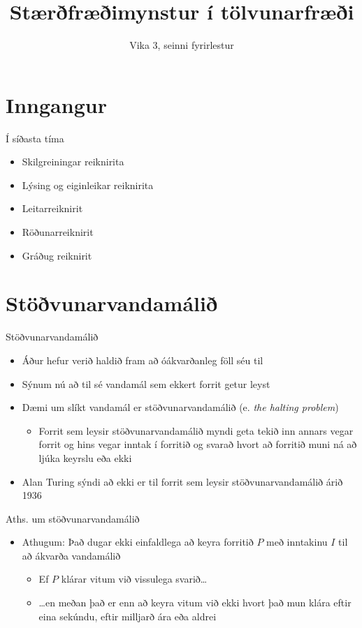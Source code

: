 \documentclass[handout]{beamer}
\title{Stærðfræðimynstur í tölvunarfræði}
\subtitle{Vika 3, seinni fyrirlestur}
\begin{document}
\begin{frame}
\titlepage
\end{frame}

\section{Inngangur}

\begin{frame}{Í síðasta tíma}
\begin{itemize}
 \item Skilgreiningar reiknirita
 \item Lýsing og eiginleikar reiknirita
 \item Leitarreiknirit
 \item Röðunarreiknirit
 \item Gráðug reiknirit
\end{itemize}
\end{frame}

\section{Stöðvunarvandamálið}

\begin{frame}{Stöðvunarvandamálið}
\begin{itemize}
 \item Áður hefur verið haldið fram að óákvarðanleg föll séu til
 \item Sýnum nú að til sé vandamál sem ekkert forrit getur leyst
 \item Dæmi um slíkt vandamál er stöðvunarvandamálið (e. \emph{the halting problem})
 \begin{itemize}
  \item Forrit sem leysir stöðvunarvandamálið myndi geta tekið inn annars vegar forrit og hins vegar inntak í forritið og svarað hvort að forritið muni ná að ljúka keyrslu eða ekki 
 \end{itemize}
 \item Alan Turing sýndi að ekki er til forrit sem leysir stöðvunarvandamálið árið 1936
\end{itemize}
\end{frame}

\begin{frame}{Aths. um stöðvunarvandamálið}
\begin{itemize}
 \item Athugum: Það dugar ekki einfaldlega að keyra forritið $P$ með inntakinu $I$ til að ákvarða vandamálið
 \begin{itemize}
  \item Ef $P$ klárar vitum við vissulega svarið\ldots
  \item \ldots en meðan það er enn að keyra vitum við ekki hvort það mun klára eftir eina sekúndu, eftir milljarð ára eða aldrei
 \end{itemize}
\end{itemize}
\end{frame}
\end{document}
